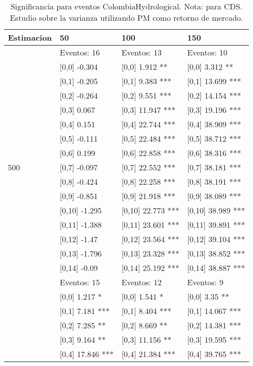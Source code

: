 \begin{table}

\caption{Significancia para eventos ColombiaHydrological. Nota: para CDS. Estudio sobre la varianza utilizando PM como retorno de mercado.}
\centering
\begin{tabular}[t]{llll}
\toprule
Estimacion & 50 & 100 & 150\\
\midrule
 & Eventos:  16 & Eventos:  13 & Eventos:  10\\
 & {}[0,0] -0.304 & {}[0,0] 1.912 ** & {}[0,0] 3.312 **\\
 & {}[0,1] -0.205 & {}[0,1] 9.383 *** & {}[0,1] 13.699 ***\\
 & {}[0,2] -0.264 & {}[0,2] 9.551 *** & {}[0,2] 14.154 ***\\
 & {}[0,3] 0.067 & {}[0,3] 11.947 *** & {}[0,3] 19.196 ***\\
\addlinespace
 & {}[0,4] 0.151 & {}[0,4] 22.744 *** & {}[0,4] 38.909 ***\\
 & {}[0,5] -0.111 & {}[0,5] 22.484 *** & {}[0,5] 38.712 ***\\
 & {}[0,6] 0.199 & {}[0,6] 22.858 *** & {}[0,6] 38.316 ***\\
500 & {}[0,7] -0.097 & {}[0,7] 22.552 *** & {}[0,7] 38.181 ***\\
 & {}[0,8] -0.424 & {}[0,8] 22.258 *** & {}[0,8] 38.191 ***\\
\addlinespace
 & {}[0,9] -0.851 & {}[0,9] 21.918 *** & {}[0,9] 38.089 ***\\
 & {}[0,10] -1.295 & {}[0,10] 22.773 *** & {}[0,10] 38.989 ***\\
 & {}[0,11] -1.388 & {}[0,11] 23.601 *** & {}[0,11] 39.891 ***\\
 & {}[0,12] -1.47 & {}[0,12] 23.564 *** & {}[0,12] 39.104 ***\\
 & {}[0,13] -1.796 & {}[0,13] 23.328 *** & {}[0,13] 38.852 ***\\
\addlinespace
 & {}[0,14] -0.09 & {}[0,14] 25.192 *** & {}[0,14] 38.887 ***\\
 & Eventos:  15 & Eventos:  12 & Eventos:  9\\
 & {}[0,0] 1.217 * & {}[0,0] 1.541 * & {}[0,0] 3.35 **\\
 & {}[0,1] 7.181 *** & {}[0,1] 8.404 *** & {}[0,1] 14.067 ***\\
 & {}[0,2] 7.285 ** & {}[0,2] 8.669 ** & {}[0,2] 14.381 ***\\
\addlinespace
 & {}[0,3] 9.164 ** & {}[0,3] 11.156 ** & {}[0,3] 19.595 ***\\
 & {}[0,4] 17.846 *** & {}[0,4] 21.384 *** & {}[0,4] 39.765 ***\\

\end{tabular}
\end{table}
